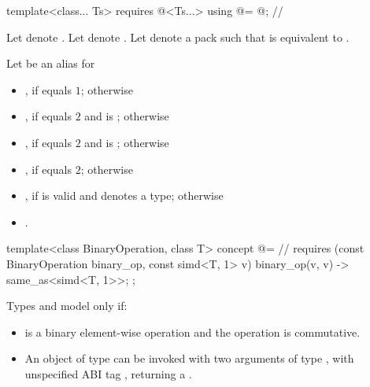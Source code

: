 \begin{itemdecl}
template<class... Ts>
  requires @\mathfloatingpoint@<Ts...>
    using @\mathcommonsimd@ = @\seebelow@; // \expos
\end{itemdecl}
\begin{itemdescr}
  \pnum
  Let  denote .
  Let  denote .
  Let  denote a pack such that  is equivalent to .

  \pnum
  Let  be an alias for
  \begin{itemize}
    \item {}, if  equals $1$; otherwise

    \item {}, if 
      equals $2$ and  is ;
      otherwise

    \item {}, if 
      equals $2$ and  is ; otherwise

    \item {}, if 
      equals $2$; otherwise

    \item {}, if  is valid and denotes a type; otherwise

    \item {}.
  \end{itemize}
\end{itemdescr}


\begin{itemdecl}
template<class BinaryOperation, class T>
  concept @\reductionoperation@ =  // \expos
    requires (const BinaryOperation binary_op, const simd<T, 1> v) {
      { binary_op(v, v) } -> same_as<simd<T, 1>>;
    };
\end{itemdecl}
\begin{itemdescr}
\pnum
Types  and  model 
only if:
\begin{itemize}
  \item {} is a binary element-wise operation and the operation is commutative.

  \item An object of type  can be invoked with two arguments of type
    , with unspecified ABI tag , returning a .
\end{itemize}
\end{itemdescr}


